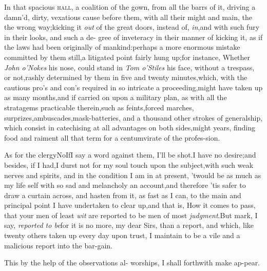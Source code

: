 \documentclass{article}
\begin{document}
In that spacious \textsc{hall}, a coalition of the gown, from all the
barrs of it, driving a damn’d, dirty, vexatious cause before them, with
all their might and main, the the wrong way;\tsh kicking it \textit{out} of
the great doors, instead of, \textit{in},\tsh and with such fury in their
looks, and such a de- gree of inveteracy in
their manner of\break
kicking it, as if the
laws had been originally  of
mankind:\tsk perhaps a more enormous mistake committed by them
still,\tsk a li\-tigated point fairly hung up;\tsk for in\-stance,
Whether \textit{John o’\thinspace Nokes} his nose, could stand in \textit{Tom
o’\thinspace Stiles} his face, without a trespass, or not,\tsk rashly
determin\-ed by them in five and twenty minutes,\break which,
with the cautious pro’s and con’s required in so intricate a
proceeding,\break might have taken up as many months,\tsk and if
carried on upon a military plan, as  with all the stratagems practicable
there\-in,\tsk such as feints,\tsk forced marches,\tsk
surprizes,\tsk ambuscades,\tsk mask-batte\-ries, and a thousand
other strokes of generalship, which consist in catechising at all
advantages on both sides,\tsh might
 years, finding food and raiment all that term for a
centumvirate of the profes-\break sion.


As for the clergy\tsh\!\tsh No\tsh If\break I say a word against them, I’ll be
shot.\tsh I have no desire;\tsk and besides, if I had,\break \tsk I durst not for my
soul touch upon the subject,\tsh with such weak nerves and spirits, and in the
condition I am in at present, ’twould be as much as my life  self with so sad and melancholy an account,\tsk and therefore ’tis
safer to draw a curtain across, and hasten from it, as fast as I can, to the main
and principal point I have undertaken to clear up,\tsh and that is, How it comes to
pass, that your men of least \textit{wit} are reported to be men of most
\textit{judgment}.\tsh But mark,\tsk{}
I say, \textit{reported to be}\tsk for it is no more, my dear
Sirs, than a report, and which,\break
like twenty others taken up every\break
day upon trust, I maintain to be a vile\break
and a malicious report into the bar-\break gain.

This by the help of the observations al-\break
{}\break
{}\break
worships, I shall forthwith make ap-\break pear.
\end{document}
